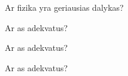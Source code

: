 \documentclass{exam}
\begin{document}
	\begin{questions}
		\raggedcolumns\begin{multicols}{2}
			\question Ar fizika yra geriausias dalykas? \begin{choices}
				\choice 
				\choice 
				\choice 
				\choice 
			\end{choices}
			\question Ar as adekvatus? \begin{choices}
				\choice 
				\choice 
				\choice 
				\choice 
			\end{choices}
			\question Ar as adekvatus? \begin{choices}
				\choice 
				\choice 
				\choice 
				\choice 
			\end{choices}
			\question Ar as adekvatus? \begin{choices}
				\choice 
				\choice 
				\choice 
				\choice
			\end{choices}
		\end{multicols}
	\end{questions}
	
\end{document}
